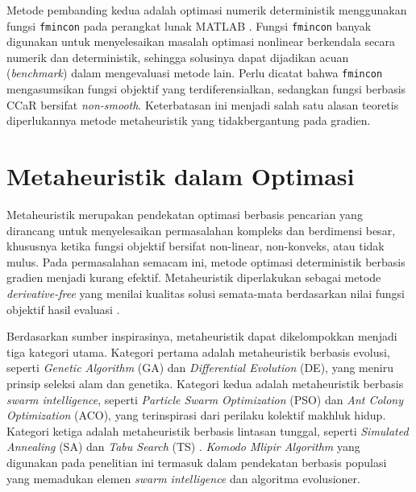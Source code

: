 Metode pembanding kedua adalah optimasi numerik deterministik menggunakan fungsi \texttt{fmincon} pada perangkat lunak MATLAB . Fungsi \texttt{fmincon} banyak digunakan untuk menyelesaikan masalah optimasi nonlinear berkendala secara numerik dan deterministik, sehingga solusinya dapat dijadikan acuan (\textit{benchmark}) dalam mengevaluasi metode lain. Perlu dicatat bahwa \texttt{fmincon} mengasumsikan fungsi objektif yang terdiferensialkan, sedangkan fungsi berbasis CCaR bersifat \textit{non-smooth}. Keterbatasan ini menjadi salah satu alasan teoretis diperlukannya metode metaheuristik yang tidakbergantung pada gradien.


\section{Metaheuristik dalam Optimasi}\label{sec:metaheuristik}

Metaheuristik merupakan pendekatan optimasi berbasis pencarian yang dirancang untuk menyelesaikan permasalahan kompleks dan berdimensi besar, khususnya ketika fungsi objektif bersifat non-linear, non-konveks, atau tidak mulus. Pada permasalahan semacam ini, metode optimasi deterministik berbasis gradien menjadi kurang efektif. Metaheuristik diperlakukan sebagai metode \textit{derivative-free} yang menilai kualitas solusi semata-mata berdasarkan nilai fungsi objektif hasil evaluasi .

Berdasarkan sumber inspirasinya, metaheuristik dapat dikelompokkan menjadi tiga kategori utama. Kategori pertama adalah metaheuristik berbasis evolusi, seperti \textit{Genetic Algorithm} (GA) dan \textit{Differential Evolution} (DE), yang meniru prinsip seleksi alam dan genetika. Kategori kedua adalah metaheuristik berbasis \textit{swarm intelligence}, seperti \textit{Particle Swarm Optimization} (PSO) dan \textit{Ant Colony Optimization} (ACO), yang terinspirasi dari perilaku kolektif makhluk hidup. Kategori ketiga adalah metaheuristik berbasis lintasan tunggal, seperti \textit{Simulated Annealing} (SA) dan \textit{Tabu Search} (TS) . \textit{Komodo Mlipir Algorithm} yang digunakan pada penelitian ini termasuk dalam pendekatan berbasis populasi yang memadukan elemen \textit{swarm intelligence} dan algoritma evolusioner.


